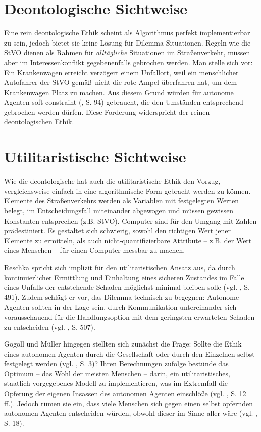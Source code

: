 \documentclass[a4paper, 12pt, titlepage]{scrartcl}
\begin{document}
\section{Deontologische Sichtweise}
	Eine rein deontologische Ethik scheint als Algorithmus perfekt implementierbar zu sein, jedoch bietet sie keine L\"osung f\"ur Dilemma-Situationen. Regeln wie die StVO dienen als Rahmen f\"ur \emph{allt\"agliche} Situationen im Stra\ss enverkehr, m\"ussen aber im Interessenkonflikt gegebenenfalls gebrochen werden. Man stelle sich vor: Ein Krankenwagen erreicht verz\"ogert einem Unfallort, weil ein menschlicher Autofahrer der StVO gem\"a\ss\ nicht die rote Ampel \"uberfahren hat, um dem Krankenwagen Platz zu machen. Aus diesem Grund w\"urden f\"ur autonome Agenten \glqq soft constraint\grqq{} (\autocite{Gerdes2015}, S. 94) gebraucht, die den Umst\"anden entsprechend gebrochen werden d\"urfen. Diese Forderung widerspricht der reinen deontologischen Ethik. 
\section{Utilitaristische Sichtweise}
	Wie die deontologische hat auch die utilitaristische Ethik den Vorzug, vergleichsweise einfach in eine algorithmische Form gebracht werden zu k\"onnen. Elemente des Stra\ss enverkehrs werden als Variablen mit festgelegten Werten belegt, im Entscheidungsfall miteinander abgewogen und m\"ussen gewissen Konstanten entsprechen (z.B. StVO). Computer sind f\"ur den Umgang mit Zahlen pr\"adestiniert. Es gestaltet sich schwierig, sowohl den richtigen Wert jener Elemente zu ermitteln, als auch nicht-quantifizierbare Attribute -- z.B. der Wert eines Menschen -- f\"ur einen Computer messbar zu machen. 

	Reschka \autocite{Reschka2015} spricht sich implizit f\"ur den utilitaristischen Ansatz aus, da durch kontinuierlicher Ermittlung und Einhaltung eines sicheren Zustandes im Falle eines Unfalls der entstehende Schaden m\"oglichst minimal bleiben solle (vgl. \autocite{Reschka2015}, S. 491). Zudem schl\"agt er vor, das Dilemma technisch zu begegnen: Autonome Agenten sollten in der Lage sein, durch Kommunikation untereinander sich vorausschauend f\"ur die Handlungsoption mit dem geringsten erwarteten Schaden zu entscheiden (vgl. \autocite{Reschka2015}, S. 507).
	
	Gogoll und M\"uller \autocite{Gogoll2016} hingegen stellten sich zun\"achst die Frage: Sollte die Ethik eines autonomen Agenten durch die Gesellschaft oder durch den Einzelnen selbst festgelegt werden (vgl. \autocite{Gogoll2016}, S. 3)? Ihren Berechnungen zufolge best\"unde das Optimum -- das Wohl der meisten Menschen -- darin, ein utilitaristisches, staatlich vorgegebenes Modell zu implementieren, was im Extremfall die Opferung der eigenen Insassen des autonomen Agenten einschl\"o\ss e (vgl. \autocite{Gogoll2016}, S. 12 ff.). Jedoch r\"umen sie ein, dass viele Menschen sich gegen einen selbst opfernden autonomen Agenten entscheiden w\"urden, obwohl dieser im Sinne aller w\"are (vgl. \autocite{Gogoll2016}, S. 18). 
	
\end{document}

